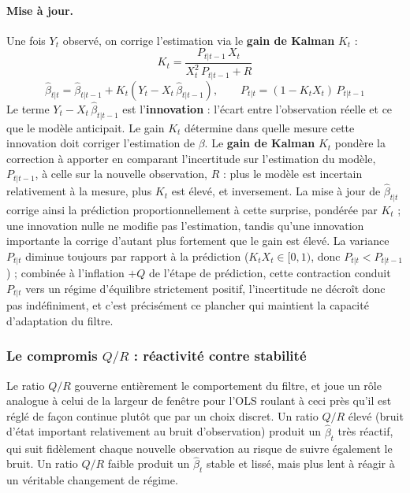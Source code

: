 \documentclass{article}
\begin{document}
\paragraph{Mise à jour.} Une fois $Y_t$ observé, on corrige l'estimation via le \textbf{gain de Kalman} $K_t$ :
\begin{equation}
K_t = \frac{P_{t|t-1}\,X_t}{X_t^2\,P_{t|t-1} + R}
\end{equation}
\begin{equation}
\hat\beta_{t|t} = \hat\beta_{t|t-1} + K_t\left(Y_t - X_t\,\hat\beta_{t|t-1}\right), \qquad P_{t|t} = (1 - K_t X_t)\,P_{t|t-1}
\end{equation}
Le terme $Y_t - X_t\,\hat\beta_{t|t-1}$ est l'\textbf{innovation} : l'écart entre l'observation réelle et ce que le modèle anticipait. Le gain $K_t$ détermine dans quelle mesure cette innovation doit corriger l'estimation de $\beta$.
Le \textbf{gain de Kalman} $K_t$ pondère la correction à apporter en comparant l'incertitude sur l'estimation du modèle, $P_{t|t-1}$, à celle sur la nouvelle observation, $R$ : plus le modèle est incertain relativement à la mesure, plus $K_t$ est élevé, et inversement. La mise à jour de $\hat\beta_{t|t}$ corrige ainsi la prédiction proportionnellement à cette surprise, pondérée par $K_t$ ; une innovation nulle ne modifie pas l'estimation, tandis qu'une innovation importante la corrige d'autant plus fortement que le gain est élevé. La variance $P_{t|t}$ diminue toujours par rapport à la prédiction ($K_t X_t \in [0,1)$, donc $P_{t|t} < P_{t|t-1}$) ; combinée à l'inflation $+Q$ de l'étape de prédiction, cette contraction conduit $P_{t|t}$ vers un régime d'équilibre strictement positif, l'incertitude ne décroît donc pas indéfiniment, et c'est précisément ce plancher qui maintient la capacité d'adaptation du filtre.
\subsubsection*{Le compromis $Q/R$ : réactivité contre stabilité}
Le ratio $Q/R$ gouverne entièrement le comportement du filtre, et joue un rôle analogue à celui de la largeur de fenêtre pour l'OLS roulant à ceci près qu'il est réglé de façon continue plutôt que par un choix discret. Un ratio $Q/R$ élevé (bruit d'état important relativement au bruit d'observation) produit un $\hat\beta_t$ très réactif, qui suit fidèlement chaque nouvelle observation au risque de suivre également le bruit. Un ratio $Q/R$ faible produit un $\hat\beta_t$ stable et lissé, mais plus lent à réagir à un véritable changement de régime.
\end{document}
